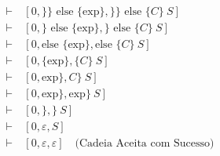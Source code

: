 \documentclass[ 12pt, a4paper]{article}
\begin{document}
\begin{small}
\begin{align*}
    \vdash\ &[0, \} \} \text{ else } \{ \text{exp} \}, \} \} \text{ else } \{ C \}\ S] \\
    \vdash\ &[0, \} \text{ else } \{ \text{exp} \}, \} \text{ else } \{ C \}\ S] \\
    \vdash\ &[0, \text{else } \{ \text{exp} \}, \text{else } \{ C \}\ S] \\
    \vdash\ &[0, \{ \text{exp} \}, \{ C \}\ S] \\
    \vdash\ &[0, \text{exp} \}, C \}\ S] \\
    \vdash\ &[0, \text{exp} \}, \text{exp} \}\ S] \\
    \vdash\ &[0, \}, \}\ S] \\
    \vdash\ &[0, \varepsilon, S] \\
    \vdash\ &[0, \varepsilon, \varepsilon] \quad \text{(Cadeia Aceita com Sucesso)}
\end{align*}
\end{small}
\end{document}
